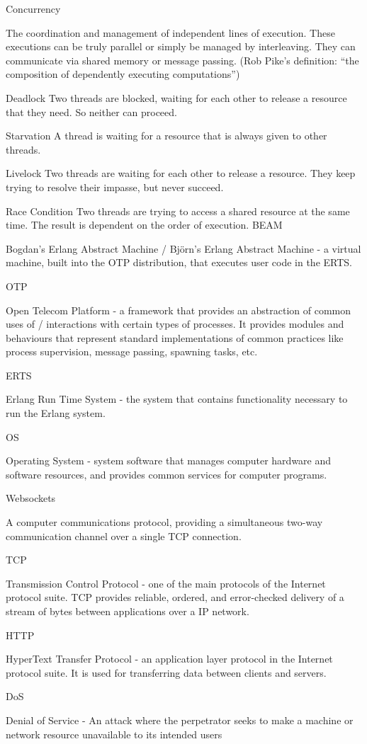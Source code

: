 \documentclass[]{project_interim}
\begin{document}
Concurrency

The coordination and management of independent lines of execution. These executions
can be truly parallel or simply be managed by interleaving. They can communicate
via shared memory or message passing. (Rob Pike's definition: “the composition of
dependently executing computations”)

Deadlock
Two threads are blocked, waiting for each other to release a resource that they need. So neither can proceed.

Starvation
A thread is waiting for a resource that is always given to other threads.

Livelock
Two threads are waiting for each other to release a resource. They keep trying to resolve their impasse, but never succeed.

Race Condition
Two threads are trying to access a shared resource at the same time. The result is dependent on the order of execution.
BEAM

Bogdan's Erlang Abstract Machine / Björn's Erlang Abstract Machine - a virtual machine, built into the OTP
distribution, that executes user code in the ERTS.

OTP

Open Telecom Platform - a framework that provides an abstraction of common uses of / interactions with
certain types of processes. It provides modules and behaviours that represent standard implementations of
common practices like process supervision, message passing, spawning tasks, etc.

ERTS

Erlang Run Time System - the system that contains functionality necessary to run the Erlang system.

OS

Operating System - system software that manages computer hardware and software resources, and
provides common services for computer programs.

Websockets

A computer communications protocol, providing a simultaneous two-way communication channel
over a single TCP connection.

TCP

Transmission Control Protocol - one of the main protocols of the Internet protocol suite. TCP provides
reliable, ordered, and error-checked delivery of a stream of bytes between applications over a IP network.

HTTP

HyperText Transfer Protocol - an application layer protocol in the Internet protocol suite.
It is used for transferring data between clients and servers.

DoS

Denial of Service - An attack where the perpetrator seeks to make a machine or network resource unavailable
to its intended users
\end{document}
